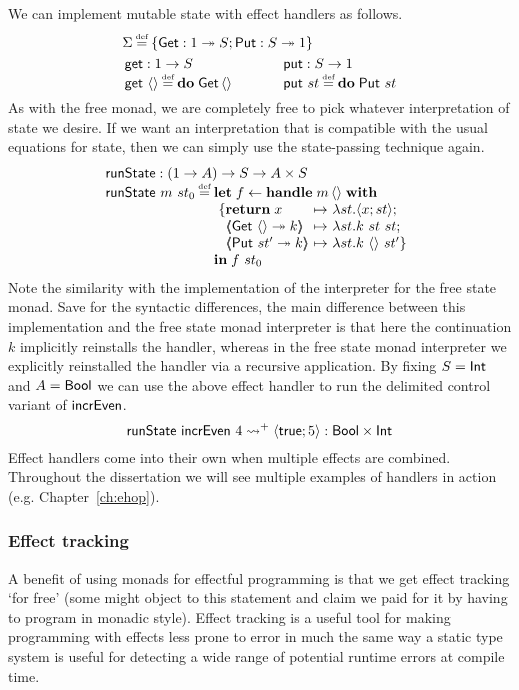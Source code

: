 \documentclass[12pt,phd,lfcs,twoside,openright,logo,leftchapter,normalheadings]{infthesis}
\theoremstyle{plain}
\theoremstyle{definition}
\begin{document}
We can implement mutable state with effect handlers as follows.
%
\[
  \ba{@{~}l@{\qquad\quad}@{~}r}
    \multicolumn{2}{l}{\Sigma \defas \{\Get : \UnitType \opto S;\Put : S \opto \UnitType\}} \smallskip\\
    \multirow{2}{*}{
      \bl
        \getF : \UnitType \to S\\
        \getF~\Unit \defas \Do\;\Get\,\Unit
      \el} &
    \multirow{2}{*}{
      \bl
        \putF : S \to \UnitType\\
        \putF~st \defas \Do\;\Put~st
      \el} \\ & %
  \ea
\]
%
As with the free monad, we are completely free to pick whatever
interpretation of state we desire. If we want an interpretation that
is compatible with the usual equations for state, then we can simply
use the state-passing technique again.
%
\[
  \bl
    \runState : (\UnitType \to A) \to S \to A \times S\\
    \runState~m~st_0 \defas
      \bl
        \Let\;f \revto \Handle\;m\,\Unit\;\With\\~\{
          \ba[t]{@{}l@{~}c@{~}l}
            \Return\;x &\mapsto& \lambda st.\Record{x;st};\\
            \OpCase{\Get}{\Unit}{k} &\mapsto& \lambda st.k~st~st;\\
            \OpCase{\Put}{st'}{k}   &\mapsto& \lambda st.k~\Unit~st'\}
          \ea\\
        \In\;f~st_0
     \el
  \el
\]
%
Note the similarity with the implementation of the interpreter for the
free state monad. Save for the syntactic differences, the main
difference between this implementation and the free state monad
interpreter is that here the continuation $k$ implicitly reinstalls
the handler, whereas in the free state monad interpreter we explicitly
reinstalled the handler via a recursive application.
%
By fixing $S = \mathsf{Int}$ and $A = \mathsf{Bool}$ we can use the above effect
handler to run the delimited control variant of $\mathsf{incrEven}$.
%
\[
  \mathsf{runState}~\mathsf{incrEven}~4 \leadsto^+ \langle \mathsf{true};5 \rangle : \mathsf{Bool} \times \mathsf{Int}
\]
%
Effect handlers come into their own when multiple effects are
combined. Throughout the dissertation we will see multiple examples of
handlers in action (e.g. Chapter~\ref{ch:ehop}).

\subsubsection{Effect tracking}
A benefit of using monads for effectful programming is that we get
effect tracking `for free' (some might object to this statement and
claim we paid for it by having to program in monadic style). Effect
tracking is a useful tool for making programming with effects less
prone to error in much the same way a static type system is useful for
detecting a wide range of potential runtime errors at compile time.
\end{document}
